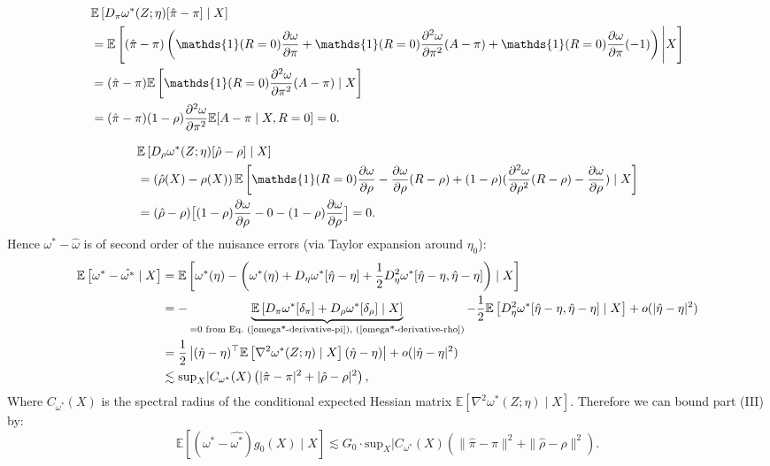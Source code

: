 \documentclass{article}
\theoremstyle{plain}
\theoremstyle{definition}
\theoremstyle{remark}
\newcommand{\E}{\mathbb{E}}                %
\newcommand{\1}{\mathds{1}}                %
\begin{document}
\begin{align} 
&\E\left[D_\pi \omega^*(Z;\eta)[\hat{\pi}-\pi] \mid X \right] \\
&= \E\left[ (\hat{\pi}-\pi) \left(\1(R=0)\frac{\partial \omega}{\partial \pi} + \1(R=0)\frac{\partial^2 \omega}{\partial \pi^2}(A-\pi) + \1(R=0)\frac{\partial \omega}{\partial \pi}(-1) \right) \Bigg| X \right] \notag \\ 
&= (\hat{\pi}-\pi) \E\left[ \1(R=0) \frac{\partial^2 \omega}{\partial \pi^2} (A-\pi) \mid X \right] \notag \\ 
&= (\hat{\pi}-\pi) (1-\rho) \frac{\partial^2 \omega}{\partial \pi^2} \E[A-\pi \mid X, R=0] = 0. 
\label{omega*-derivative-pi}
\end{align}

\begin{align} 
&\E\left[D_\rho\omega^*(Z;\eta)[\hat\rho-\rho]\mid X\right] \notag \\
&= \left(\hat\rho(X) - \rho(X)\right)\E\left[ \1(R=0)\frac{\partial \omega}{\partial \rho} - \frac{\partial \omega}{\partial \rho}(R-\rho) + (1-\rho)(\frac{\partial^2 \omega}{\partial \rho^2}(R-\rho) - \frac{\partial \omega}{\partial \rho}) \mid X \right] \notag \\ 
&= (\hat\rho - \rho)\bigl[(1-\rho)\frac{\partial \omega}{\partial \rho} - 0 - (1-\rho)\frac{\partial \omega}{\partial \rho}\bigr]=0. 
\label{omega*-derivative-rho}
\end{align}
Hence $\omega^*-\hat\omega$ is of second order of the nuisance errors (via Taylor expansion around $\eta_0$):
\begin{align} 
\E\left[\omega^*-\hat{\omega^*} \mid X\right] &= \E\left[ \omega^*(\eta) - \left( \omega^*(\eta) + D_\eta \omega^*[\hat{\eta}-\eta] + \frac{1}{2}D^2_\eta \omega^*[\hat{\eta}-\eta, \hat{\eta}-\eta] \right) \mid X\right] \notag \\ 
&= -\underbrace{\E\left[ D_\pi \omega^*[\delta_\pi] + D_\rho \omega^*[\delta_\rho] \mid X \right]}_{=0 \text{ from Eq.~(\ref{omega*-derivative-pi}), (\ref{omega*-derivative-rho})}} - \frac{1}{2}\E\left[ D^2_\eta \omega^*[\hat{\eta}-\eta, \hat{\eta}-\eta] \mid X \right] + o(|\hat{\eta}-\eta|^2) \notag \\
&=\frac{1}{2}\left | (\hat{\eta}-\eta)^\top \E\left[ \nabla^2 \omega^*(Z;\eta) \mid X \right] (\hat{\eta}-\eta) \right| + o(|\hat{\eta}-\eta|^2) \\
&\lesssim \text{sup}_{X}|C_{\omega^*}(X) \left(|\hat{\pi}-\pi|^2 + |\hat{\rho}-\rho|^2\right),
\end{align}
Where $C_{\omega^*}(X)$ is the spectral radius of the conditional expected Hessian matrix $\E\left[ \nabla^2 \omega^*(Z;\eta) \mid X \right]$.
Therefore we can bound part (III) by:
\begin{equation}
\label{part-III}
    \E\left[(\omega^*-\hat{\omega^*})g_0(X) \mid X\right] \lesssim G_0\cdot\text{sup}_{X}|C_{\omega^*}(X) \left(\|\hat{\pi}-\pi\|^2 + \|\hat{\rho}-\rho\|^2\right).
\end{equation}
\end{document}
